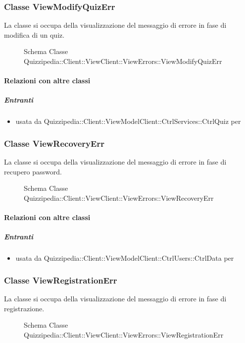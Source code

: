 \subsubsection{Classe ViewModifyQuizErr}
La classe si occupa della visualizzazione del messaggio di errore in fase di modifica di un quiz.
\begin{figure}[H]
\centering
\noindent{}
\caption[Schema Classe ViewModifyQuizErr]{Schema Classe Quizzipedia::Client::ViewClient::ViewErrors::ViewModifyQuizErr}
\end{figure}
\paragraph{Relazioni con altre classi}
\subparagraph{Entranti}
\begin{itemize}
\item usata da Quizzipedia::Client::ViewModelClient::CtrlServices::CtrlQuiz per 
\end{itemize}
\subsubsection{Classe ViewRecoveryErr}
La classe si occupa della visualizzazione del messaggio di errore in fase di recupero password.
\begin{figure}[H]
\centering
\noindent{}
\caption[Schema Classe ViewRecoveryErr]{Schema Classe Quizzipedia::Client::ViewClient::ViewErrors::ViewRecoveryErr}
\end{figure}
\paragraph{Relazioni con altre classi}
\subparagraph{Entranti}
\begin{itemize}
\item usata da Quizzipedia::Client::ViewModelClient::CtrlUsers::CtrlData per 
\end{itemize}
\subsubsection{Classe ViewRegistrationErr}
La classe si occupa della visualizzazione del messaggio di errore in fase di registrazione.
\begin{figure}[H]
\centering
\noindent{}
\caption[Schema Classe ViewRegistrationErr]{Schema Classe Quizzipedia::Client::ViewClient::ViewErrors::ViewRegistrationErr}
\end{figure}
